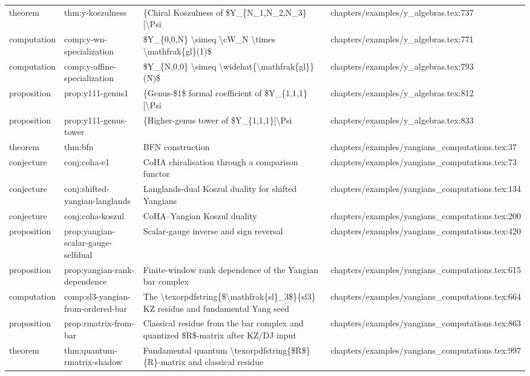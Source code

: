 \documentclass[11pt]{article}
\begin{document}
\begin{longtable}{L{0.10\textwidth}L{0.26\textwidth}L{0.42\textwidth}L{0.22\textwidth}}
theorem & thm:y-koszulness & \{Chiral Koszulness of \$Y\_\{N\_1,N\_2,N\_3\}[\textbackslash{}Psi & chapters/examples/y\_algebras.tex:737\\
computation & comp:y-wn-specialization & \$Y\_\{0,0,N\} \textbackslash{}simeq \textbackslash{}cW\_N \textbackslash{}times \textbackslash{}mathfrak\{gl\}(1)\$ & chapters/examples/y\_algebras.tex:771\\
computation & comp:y-affine-specialization & \$Y\_\{N,0,0\} \textbackslash{}simeq \textbackslash{}widehat\{\textbackslash{}mathfrak\{gl\}\}(N)\$ & chapters/examples/y\_algebras.tex:793\\
proposition & prop:y111-genus1 & \{Genus-\$1\$ formal coefficient of \$Y\_\{1,1,1\}[\textbackslash{}Psi & chapters/examples/y\_algebras.tex:812\\
proposition & prop:y111-genus-tower & \{Higher-genus tower of \$Y\_\{1,1,1\}[\textbackslash{}Psi & chapters/examples/y\_algebras.tex:833\\
theorem & thm:bfn & BFN construction & chapters/examples/yangians\_computations.tex:37\\
conjecture & conj:coha-e1 & CoHA chiralisation through a comparison functor & chapters/examples/yangians\_computations.tex:73\\
conjecture & conj:shifted-yangian-langlands & Langlands-dual Koszul duality for shifted Yangians & chapters/examples/yangians\_computations.tex:134\\
conjecture & conj:coha-koszul & CoHA--Yangian Koszul duality & chapters/examples/yangians\_computations.tex:200\\
proposition & prop:yangian-scalar-gauge-selfdual & Scalar-gauge inverse and sign reversal & chapters/examples/yangians\_computations.tex:420\\
proposition & prop:yangian-rank-dependence & Finite-window rank dependence of the Yangian bar complex & chapters/examples/yangians\_computations.tex:615\\
computation & comp:sl3-yangian-from-ordered-bar & The \textbackslash{}texorpdfstring\{\$\textbackslash{}mathfrak\{sl\}\_3\$\}\{sl3\} KZ residue and fundamental Yang seed & chapters/examples/yangians\_computations.tex:664\\
proposition & prop:rmatrix-from-bar & Classical residue from the bar complex and quantized \$R\$-matrix after KZ/DJ input & chapters/examples/yangians\_computations.tex:863\\
theorem & thm:quantum-rmatrix-shadow & Fundamental quantum \textbackslash{}texorpdfstring\{\$R\$\}\{R\}-matrix and classical residue & chapters/examples/yangians\_computations.tex:997\\

\end{longtable}
\end{document}
